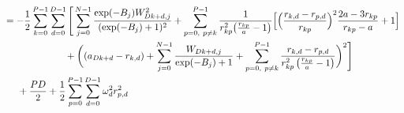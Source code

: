 \documentclass[12pt]{article}
\begin{document}
\begin{align*}
&= -\frac{1}{2} \sum_{k=0}^{P-1} \sum_{d=0}^{D-1}
\Bigg[  \sum_{j=0}^{N-1} \frac{\exp(-B_j)W_{Dk+d,j}^2}{(\exp(-B_j)+1)^2}
+ \sum_{p=0, \ p\neq k}^{P-1}  \frac{1}{r_{kp}^2 \big( \frac{r_{kp}}{a} -1 \big)}
\Big[ 
\Big( \frac{r_{k,d}-r_{p,d}}{r_{kp}} \Big)^2 \frac{2a-3r_{kp}}{r_{kp}-a}
 +1
\Big]  \\
& \hspace*{2.25 cm}
+ \bigg( 
(a_{Dk+d} -r_{k,d} )
+\sum_{j=0}^{N-1}  \frac{W_{Dk+d,j}}{\exp(-B_j)+1}
+\sum_{p=0, \ p\neq k}^{P-1} \frac{r_{k,d}-r_{p,d}}{r_{kp}^2 \left( \frac{r_{kp}}{a} -1 \right)}
 \bigg)^2  \Bigg]\\
& \hspace*{.5 cm} + \frac{PD}{2}+\frac{1}{2} \sum_{p=0}^{P-1} \sum_{d=0}^{D-1} \omega_d^2r_{p,d}^2\\
\end{align*}
\end{document}
